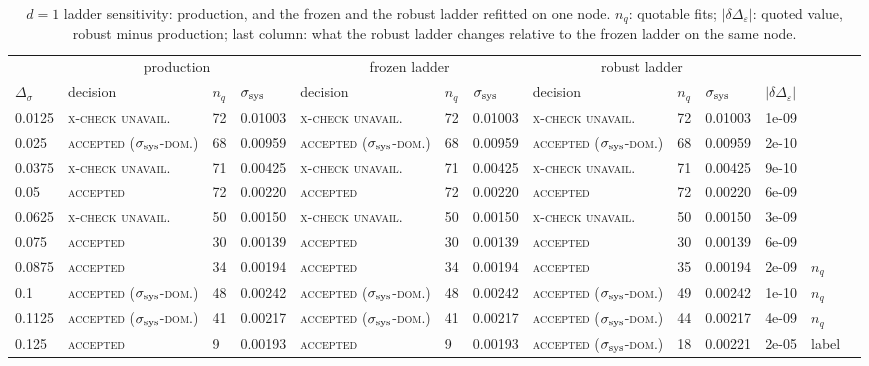 \documentclass[10pt,a4paper]{article}
\newcommand{\Ds}{\Delta_\sigma}
\newcommand{\De}{\Delta_\varepsilon}
\newcommand{\lbl}[1]{{\mdseries\scshape #1}}
\newcommand{\ssys}{\sigma_{\rm sys}}
\begin{document}
\begin{table}[htbp]\centering\scriptsize\setlength{\tabcolsep}{3pt}
\caption{$d=1$ ladder sensitivity: production, and the frozen and the robust ladder refitted on one node. $n_q$: quotable fits; $|\delta\De|$:
quoted value, robust minus production; last column: what the robust ladder changes relative to the frozen ladder on the same node.}\label{tab:robustladder}
\begin{tabular}{@{}lllllllllllll@{}}\toprule
 & \multicolumn{3}{c}{production} & \multicolumn{3}{c}{frozen ladder} & \multicolumn{3}{c}{robust ladder} & & \\
$\Ds$ & decision & $n_q$ & $\ssys$ & decision & $n_q$ & $\ssys$ & decision & $n_q$ & $\ssys$ & $|\delta\De|$ & \\\midrule
0.0125 & \lbl{x-check unavail.} & 72 & 0.01003 & \lbl{x-check unavail.} & 72 & 0.01003 & \lbl{x-check unavail.} & 72 & 0.01003 & 1e-09 &  \\
0.025 & \lbl{accepted ($\sigma_{\rm sys}$-dom.)} & 68 & 0.00959 & \lbl{accepted ($\sigma_{\rm sys}$-dom.)} & 68 & 0.00959 & \lbl{accepted ($\sigma_{\rm sys}$-dom.)} & 68 & 0.00959 & 2e-10 &  \\
0.0375 & \lbl{x-check unavail.} & 71 & 0.00425 & \lbl{x-check unavail.} & 71 & 0.00425 & \lbl{x-check unavail.} & 71 & 0.00425 & 9e-10 &  \\
0.05 & \lbl{accepted} & 72 & 0.00220 & \lbl{accepted} & 72 & 0.00220 & \lbl{accepted} & 72 & 0.00220 & 6e-09 &  \\
0.0625 & \lbl{x-check unavail.} & 50 & 0.00150 & \lbl{x-check unavail.} & 50 & 0.00150 & \lbl{x-check unavail.} & 50 & 0.00150 & 3e-09 &  \\
0.075 & \lbl{accepted} & 30 & 0.00139 & \lbl{accepted} & 30 & 0.00139 & \lbl{accepted} & 30 & 0.00139 & 6e-09 &  \\
0.0875 & \lbl{accepted} & 34 & 0.00194 & \lbl{accepted} & 34 & 0.00194 & \lbl{accepted} & 35 & 0.00194 & 2e-09 & $n_q$ \\
0.1 & \lbl{accepted ($\sigma_{\rm sys}$-dom.)} & 48 & 0.00242 & \lbl{accepted ($\sigma_{\rm sys}$-dom.)} & 48 & 0.00242 & \lbl{accepted ($\sigma_{\rm sys}$-dom.)} & 49 & 0.00242 & 1e-10 & $n_q$ \\
0.1125 & \lbl{accepted ($\sigma_{\rm sys}$-dom.)} & 41 & 0.00217 & \lbl{accepted ($\sigma_{\rm sys}$-dom.)} & 41 & 0.00217 & \lbl{accepted ($\sigma_{\rm sys}$-dom.)} & 44 & 0.00217 & 4e-09 & $n_q$ \\
0.125 & \lbl{accepted} & 9 & 0.00193 & \lbl{accepted} & 9 & 0.00193 & \lbl{accepted ($\sigma_{\rm sys}$-dom.)} & 18 & 0.00221 & 2e-05 & label \\

\end{tabular}
\end{table}
\end{document}
